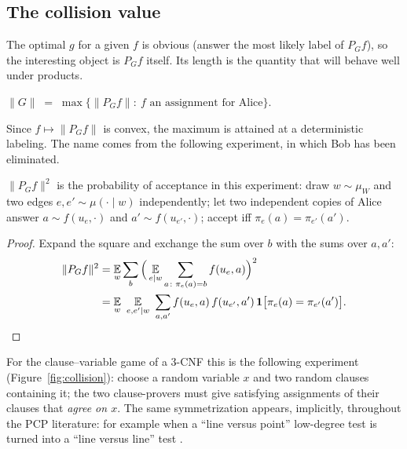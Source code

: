\subsection{The collision value}

The optimal $g$ for a given $f$ is obvious (answer the most likely label of $P_Gf$), so the interesting object is $P_Gf$ itself.  Its length is the quantity that will behave well under products.

\begin{definition}\label{def:coll}
$\|G\|\;=\;\max\{\|P_Gf\|:\ f\text{ an assignment for Alice}\}$.
\end{definition}

\noindent
Since $f\mapsto\|P_Gf\|$ is convex, the maximum is attained at a deterministic labeling.  The name comes from the following experiment, in which Bob has been eliminated.

\begin{lemma}\label{lem:collgame}
$\|P_Gf\|^2$ is the probability of acceptance in this experiment: draw $w\sim\mu_W$ and two edges $e,e'\sim\mu(\cdot\mid w)$ independently; let two independent copies of Alice answer $a\sim f(u_e,\cdot)$ and $a'\sim f(u_{e'},\cdot)$; accept iff $\pi_e(a)=\pi_{e'}(a')$.
\end{lemma}
\begin{proof}
Expand the square and exchange the sum over $b$ with the sums over $a,a'$:
\begin{align*}
  \|P_Gf\|^2&=\E_w\sum_b\Big(\E_{e\mid w}\sum_{a\colon\pi_e(a)=b}f(u_e,a)\Big)^2\\
  &=\E_w\ \E_{e,e'\mid w}\ \sum_{a,a'}f(u_e,a)\,f(u_{e'},a')\,\mathbf 1\big[\pi_e(a)=\pi_{e'}(a')\big].\qedhere
\end{align*}
\end{proof}

\noindent
For the clause--variable game of a $3$-CNF this is the following experiment (Figure~\ref{fig:collision}): choose a random variable $x$ and two random clauses containing it; the two clause-provers must give satisfying assignments of their clauses that \emph{agree on $x$}.
The same symmetrization appears, implicitly, throughout the PCP literature: for example when a ``line versus point'' low-degree test is turned into a ``line versus line'' test \citep[footnote to Section~2.3]{DinurSteurer14}.

